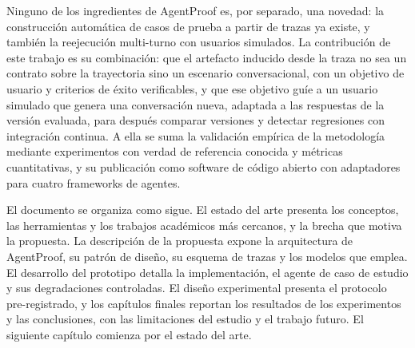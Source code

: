 Ninguno de los ingredientes de AgentProof es, por separado, una novedad: la construcción automática de casos de prueba a partir de trazas ya existe, y también la reejecución multi-turno con usuarios simulados. La contribución de este trabajo es su combinación: que el artefacto inducido desde la traza no sea un contrato sobre la trayectoria sino un escenario conversacional, con un objetivo de usuario y criterios de éxito verificables, y que ese objetivo guíe a un usuario simulado que genera una conversación nueva, adaptada a las respuestas de la versión evaluada, para después comparar versiones y detectar regresiones con integración continua. A ella se suma la validación empírica de la metodología mediante experimentos con verdad de referencia conocida y métricas cuantitativas, y su publicación como software de código abierto con adaptadores para cuatro frameworks de agentes.
\par\vspace{6pt}
El documento se organiza como sigue. El estado del arte presenta los conceptos, las herramientas y los trabajos académicos más cercanos, y la brecha que motiva la propuesta. La descripción de la propuesta expone la arquitectura de AgentProof, su patrón de diseño, su esquema de trazas y los modelos que emplea. El desarrollo del prototipo detalla la implementación, el agente de caso de estudio y sus degradaciones controladas. El diseño experimental presenta el protocolo pre-registrado, y los capítulos finales reportan los resultados de los experimentos y las conclusiones, con las limitaciones del estudio y el trabajo futuro. El siguiente capítulo comienza por el estado del arte.
\par
\endgroup
